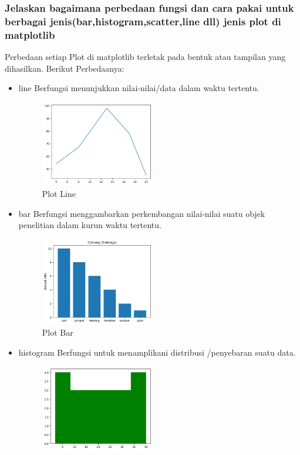 \subsubsection{Jelaskan bagaimana perbedaan fungsi dan cara pakai untuk berbagai jenis(bar,histogram,scatter,line dll) jenis plot di matplotlib}
\hfill \break
Perbedaan setiap Plot di matplotlib terletak pada bentuk atau tampilan yang dihasilkan. 
Berikut Perbedaanya:
\begin{itemize}
    \item line
   Berfungsi menunjukkan nilai-nilai/data dalam waktu tertentu.
   
\begin{figure}[H]	
    \includegraphics[width=5cm]{figures/6/1174074/Teori/plot_line.png}
    \centering
    \caption{Plot Line}
\end{figure}
    \item bar
  Berfungsi menggambarkan perkembangan nilai-nilai suatu objek penelitian dalam kurun waktu tertentu.
   
\begin{figure}[H]	
    \includegraphics[width=5cm]{figures/6/1174074/Teori/plot_bar.png}
    \centering
    \caption{Plot Bar}
\end{figure}
    \item histogram
   Berfungsi untuk menamplikani distribusi /penyebaran suatu data.
    
\begin{figure}[H]	
    \includegraphics[width=5cm]{figures/6/1174074/Teori/histogram.png}

\end{figure}
\end{itemize}
